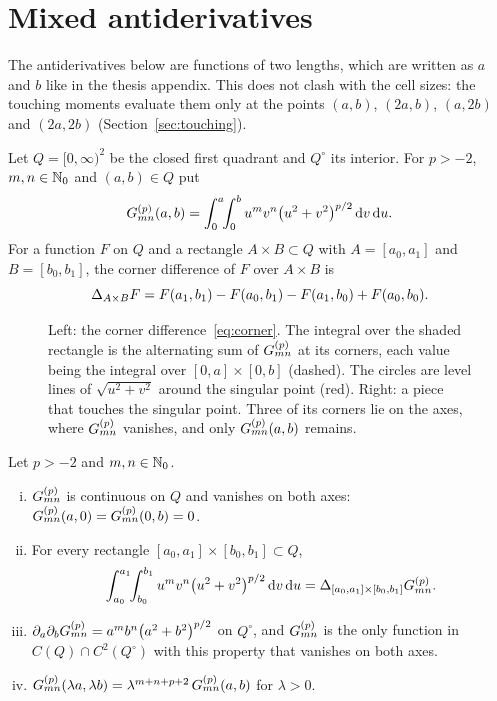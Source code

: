 \section{Mixed antiderivatives}
\label{sec:antiderivatives}

The antiderivatives below are functions of two lengths, which are written as $a$ and $b$ like in the thesis appendix.
This does not clash with the cell sizes: the touching moments evaluate them only at the points $(a,b)$, $(2a,b)$,
$(a,2b)$ and $(2a,2b)$ (Section~\ref{sec:touching}).

 Let $Q=[0,\infty)^2$ be the closed first
quadrant and $Q^\circ$ its interior. For $p>-2$, $m,n\in\mathbb{N}_0$ and $(a,b)\in Q$ put
\begin{equation}
    \label{eq:G}
    G^{(p)}_{mn}(a,b) = \int_0^a\!\!\int_0^b u^m v^n\bigl(u^2+v^2\bigr)^{p/2}\,\mathrm{d} v\,\mathrm{d} u .
\end{equation}
For a function $F$ on $Q$ and a rectangle $A\times B\subset Q$ with $A=[a_0,a_1]$ and $B=[b_0,b_1]$, the corner
difference of $F$ over $A\times B$ is
\begin{equation}
    \Delta_{A\times B}F = F(a_1,b_1)-F(a_0,b_1)-F(a_1,b_0)+F(a_0,b_0).
\end{equation}

\begin{figure}[ht]
    \centering
    
    \caption{Left: the corner difference~\eqref{eq:corner}. The integral over the shaded rectangle is the alternating
    sum of $G^{(p)}_{mn}$ at its corners, each value being the integral over $[0,a]\times[0,b]$ (dashed). The circles
    are level lines of $\sqrt{u^2+v^2}$ around the singular point (red). Right: a piece that touches the singular
    point. Three of its corners lie on the axes, where $G^{(p)}_{mn}$ vanishes, and only $G^{(p)}_{mn}(a,b)$ remains.}
    \label{fig:corner}
\end{figure}

 Let $p>-2$ and $m,n\in\mathbb{N}_0$.
\begin{enumerate}[(i)]
    \item $G^{(p)}_{mn}$ is continuous on $Q$ and vanishes on both axes: $G^{(p)}_{mn}(a,0)=G^{(p)}_{mn}(0,b)=0$.
    \item For every rectangle $[a_0,a_1]\times[b_0,b_1]\subset Q$,
    \begin{equation}
        \label{eq:corner}
        \int_{a_0}^{a_1}\!\!\int_{b_0}^{b_1} u^mv^n\bigl(u^2+v^2\bigr)^{p/2}\,\mathrm{d} v\,\mathrm{d} u
        = \Delta_{[a_0,a_1]\times[b_0,b_1]}G^{(p)}_{mn} .
    \end{equation}
    \item $\partial_a\partial_bG^{(p)}_{mn}=a^mb^n\bigl(a^2+b^2\bigr)^{p/2}$ on $Q^\circ$, and $G^{(p)}_{mn}$ is the only
    function in $C(Q)\cap C^2(Q^\circ)$ with this property that vanishes on both axes.
    \item $G^{(p)}_{mn}(\lambda a,\lambda b)=\lambda^{m+n+p+2}\,G^{(p)}_{mn}(a,b)$ for $\lambda>0$.
\end{enumerate}

